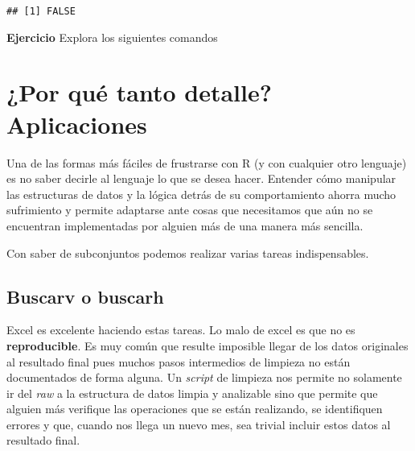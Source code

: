 \documentclass[]{article}
\newenvironment{Shaded}{\begin{snugshade}}{\end{snugshade}}
\newcommand{\KeywordTok}[1]{\textcolor[rgb]{0.13,0.29,0.53}{\textbf{#1}}}
\newcommand{\DecValTok}[1]{\textcolor[rgb]{0.00,0.00,0.81}{#1}}
\newcommand{\StringTok}[1]{\textcolor[rgb]{0.31,0.60,0.02}{#1}}
\newcommand{\OperatorTok}[1]{\textcolor[rgb]{0.81,0.36,0.00}{\textbf{#1}}}
\newcommand{\NormalTok}[1]{#1}
\begin{document}
\begin{verbatim}
## [1] FALSE
\end{verbatim}

\textbf{Ejercicio} Explora los siguientes comandos

\begin{Shaded}
\end{Shaded}

\section{¿Por qué tanto detalle?
Aplicaciones}\label{por-que-tanto-detalle-aplicaciones}

Una de las formas más fáciles de frustrarse con R (y con cualquier otro
lenguaje) es no saber decirle al lenguaje lo que se desea hacer.
Entender cómo manipular las estructuras de datos y la lógica detrás de
su comportamiento ahorra mucho sufrimiento y permite adaptarse ante
cosas que necesitamos que aún no se encuentran implementadas por alguien
más de una manera más sencilla.

Con saber de subconjuntos podemos realizar varias tareas indispensables.

\subsection{Buscarv o buscarh}\label{buscarv-o-buscarh}

Excel es excelente haciendo estas tareas. Lo malo de excel es que no es
\textbf{reproducible}. Es muy común que resulte imposible llegar de los
datos originales al resultado final pues muchos pasos intermedios de
limpieza no están documentados de forma alguna. Un \emph{script} de
limpieza nos permite no solamente ir del \emph{raw} a la estructura de
datos limpia y analizable sino que permite que alguien más verifique las
operaciones que se están realizando, se identifiquen errores y que,
cuando nos llega un nuevo mes, sea trivial incluir estos datos al
resultado final.
\end{document}
